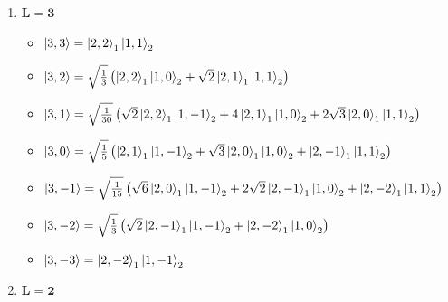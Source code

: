 \begin{enumerate}
    \item $\boldsymbol{L=3}$
        \begin{itemize}
            \item 
                $
                \Ket{3,3} = \Ket{2,2}_1 \Ket{1,1}_2
                $
            \item 
                $
                \Ket{3,2} = \sqrt{\frac{1}{3}} \left( \Ket{2,2}_1 \Ket{1,0}_2 + \sqrt{2} \Ket{2,1}_1 \Ket{1,1}_2 \right)
                $
            \item 
                $ 
                \Ket{3,1} = 
                \sqrt{\frac{1}{30}} \left( \sqrt{2} \Ket{2,2}_1 \Ket{1,-1}_2 + 4 \Ket{2,1}_1 \Ket{1,0}_2 + 2\sqrt{3} \Ket{2,0}_1 \Ket{1,1}_2 \right)
                $
            \item
                $ 
                \Ket{3,0} =
                \sqrt{\frac{1}{5}} \left( \Ket{2,1}_1 \Ket{1,-1}_2 + \sqrt{3} \Ket{2,0}_1 \Ket{1,0}_2 + \Ket{2,-1}_1 \Ket{1,1}_2 \right)
                $
            \item 
                $
                \Ket{3,-1} =
                \sqrt{\frac{1}{15}} \left( \sqrt{6} \Ket{2,0}_1 \Ket{1,-1}_2 + 2\sqrt{2} \Ket{2,-1}_1 \Ket{1,0}_2 + \Ket{2,-2}_1 \Ket{1,1}_2 \right)
                $
            \item
                $
                \Ket{3,-2} =
                \sqrt{\frac{1}{3}} \left( \sqrt{2} \Ket{2,-1}_1 \Ket{1,-1}_2 + \Ket{2,-2}_1 \Ket{1,0}_2 \right)
                $
            \item 
                $
                \Ket{3,-3} = \Ket{2,-2}_1 \Ket{1,-1}_2
                $
        \end{itemize}
    \item $\boldsymbol{L=2}$
\end{enumerate}
